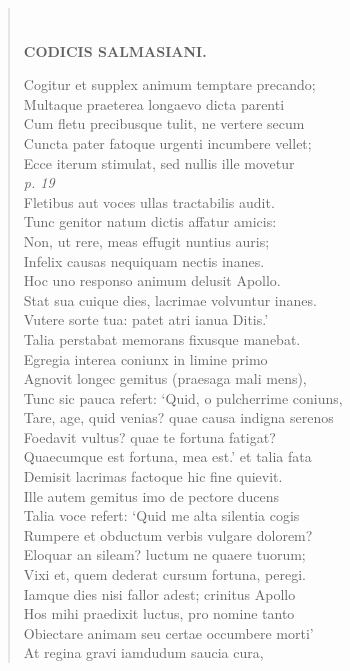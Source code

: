 \documentclass[11pt, a4paper]{report}
\begin{document}
\begin{verse}
        ﻿\pagebreak 
    \begin{center} \textbf{CODICIS SALMASIANI.} \end{center} \marginpar{[53]} Cogitur et supplex animum temptare precando; \\ Multaque praeterea longaevo dicta parenti \\ Cum fletu precibusque tulit, ne vertere secum \\ Cuncta pater fatoque urgenti incumbere vellet; \\ Ecce iterum stimulat, sed nullis ille movetur \\ \textit{p. 19} \\ Fletibus aut voces ullas tractabilis audit. \\ Tunc genitor natum dictis affatur amicis: \\ Non, ut rere, meas effugit nuntius auris; \\ Infelix causas nequiquam nectis inanes. \\ Hoc uno responso animum delusit Apollo. \\ Stat sua cuique dies, lacrimae volvuntur inanes. \\ Vutere sorte tua: patet atri ianua Ditis.’ \\ Talia perstabat memorans fixusque manebat. \\ Egregia interea coniunx in limine primo \\ Agnovit longec gemitus (praesaga mali mens), \\ Tunc sic pauca refert: ‘Quid, o pulcherrime coniuns, \\ Tare, age, quid venias? quae causa indigna serenos \\ Foedavit vultus? quae te fortuna fatigat? \\ Quaecumque est fortuna, mea est.’ et talia fata \\ Demisit lacrimas factoque hic fine quievit. \\ Ille autem gemitus imo de pectore ducens \\ Talia voce refert: ‘Quid me alta silentia cogis \\ Rumpere et obductum verbis vulgare dolorem? \\ Eloquar an sileam? luctum ne quaere tuorum; \\ Vixi et, quem dederat cursum fortuna, peregi. \\ Iamque dies nisi fallor adest; crinitus Apollo \\ Hos mihi praedixit luctus, pro nomine tanto \\ Obiectare animam seu certae occumbere morti’ \\ At regina gravi iamdudum saucia cura, \\ 

\end{verse}
\end{document}
